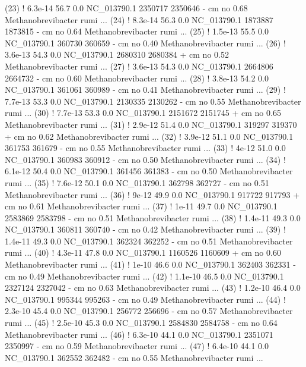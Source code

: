 \begin{sreoutput}
 (23) !   6.3e-14   56.7   0.0  NC_013790.1 2350717 2350646 -  cm    no 0.68  Methanobrevibacter rumi ...
 (24) !   8.3e-14   56.3   0.0  NC_013790.1 1873887 1873815 -  cm    no 0.64  Methanobrevibacter rumi ...
 (25) !   1.5e-13   55.5   0.0  NC_013790.1  360730  360659 -  cm    no 0.40  Methanobrevibacter rumi ...
 (26) !   3.6e-13   54.3   0.0  NC_013790.1 2680310 2680384 +  cm    no 0.52  Methanobrevibacter rumi ...
 (27) !   3.6e-13   54.3   0.0  NC_013790.1 2664806 2664732 -  cm    no 0.60  Methanobrevibacter rumi ...
 (28) !   3.8e-13   54.2   0.0  NC_013790.1  361061  360989 -  cm    no 0.41  Methanobrevibacter rumi ...
 (29) !   7.7e-13   53.3   0.0  NC_013790.1 2130335 2130262 -  cm    no 0.55  Methanobrevibacter rumi ...
 (30) !   7.7e-13   53.3   0.0  NC_013790.1 2151672 2151745 +  cm    no 0.65  Methanobrevibacter rumi ...
 (31) !   2.9e-12   51.4   0.0  NC_013790.1  319297  319370 +  cm    no 0.62  Methanobrevibacter rumi ...
 (32) !   3.9e-12   51.1   0.0  NC_013790.1  361753  361679 -  cm    no 0.55  Methanobrevibacter rumi ...
 (33) !     4e-12   51.0   0.0  NC_013790.1  360983  360912 -  cm    no 0.50  Methanobrevibacter rumi ...
 (34) !   6.1e-12   50.4   0.0  NC_013790.1  361456  361383 -  cm    no 0.50  Methanobrevibacter rumi ...
 (35) !   7.6e-12   50.1   0.0  NC_013790.1  362798  362727 -  cm    no 0.51  Methanobrevibacter rumi ...
 (36) !     9e-12   49.9   0.0  NC_013790.1  917722  917793 +  cm    no 0.61  Methanobrevibacter rumi ...
 (37) !     1e-11   49.7   0.0  NC_013790.1 2583869 2583798 -  cm    no 0.51  Methanobrevibacter rumi ...
 (38) !   1.4e-11   49.3   0.0  NC_013790.1  360811  360740 -  cm    no 0.42  Methanobrevibacter rumi ...
 (39) !   1.4e-11   49.3   0.0  NC_013790.1  362324  362252 -  cm    no 0.51  Methanobrevibacter rumi ...
 (40) !   4.3e-11   47.8   0.0  NC_013790.1 1160526 1160609 +  cm    no 0.60  Methanobrevibacter rumi ...
 (41) !     1e-10   46.6   0.0  NC_013790.1  362403  362331 -  cm    no 0.49  Methanobrevibacter rumi ...
 (42) !   1.1e-10   46.5   0.0  NC_013790.1 2327124 2327042 -  cm    no 0.63  Methanobrevibacter rumi ...
 (43) !   1.2e-10   46.4   0.0  NC_013790.1  995344  995263 -  cm    no 0.49  Methanobrevibacter rumi ...
 (44) !   2.3e-10   45.4   0.0  NC_013790.1  256772  256696 -  cm    no 0.57  Methanobrevibacter rumi ...
 (45) !   2.5e-10   45.3   0.0  NC_013790.1 2584830 2584758 -  cm    no 0.64  Methanobrevibacter rumi ...
 (46) !   6.3e-10   44.1   0.0  NC_013790.1 2351071 2350997 -  cm    no 0.59  Methanobrevibacter rumi ...
 (47) !   6.4e-10   44.1   0.0  NC_013790.1  362552  362482 -  cm    no 0.55  Methanobrevibacter rumi ...

\end{sreoutput}
